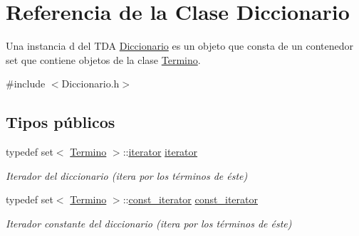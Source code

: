 \hypertarget{classDiccionario}{}\section{Referencia de la Clase Diccionario}
\label{classDiccionario}


Una instancia d del T\+DA \hyperlink{classDiccionario}{Diccionario} es un objeto que consta de un contenedor set que contiene objetos de la clase \hyperlink{classTermino}{Termino}.  




{\ttfamily \#include $<$Diccionario.\+h$>$}

\subsection*{Tipos públicos}
\begin{DoxyCompactItemize}
\item 
\mbox{\label{classDiccionario_a91820df8d3ba094a119e4ad5af589156}} 
typedef set$<$ \hyperlink{classTermino}{Termino} $>$\+::\hyperlink{classDiccionario_a91820df8d3ba094a119e4ad5af589156}{iterator} \hyperlink{classDiccionario_a91820df8d3ba094a119e4ad5af589156}{iterator}
\begin{DoxyCompactList}\small\item\em Iterador del diccionario (itera por los términos de éste) \end{DoxyCompactList}\item 
\mbox{\label{classDiccionario_a2e86a5840e62eab4f1499c2f23561cba}} 
typedef set$<$ \hyperlink{classTermino}{Termino} $>$\+::\hyperlink{classDiccionario_a2e86a5840e62eab4f1499c2f23561cba}{const\+\_\+iterator} \hyperlink{classDiccionario_a2e86a5840e62eab4f1499c2f23561cba}{const\+\_\+iterator}
\begin{DoxyCompactList}\small\item\em Iterador constante del diccionario (itera por los términos de éste) \end{DoxyCompactList}\end{DoxyCompactItemize}
